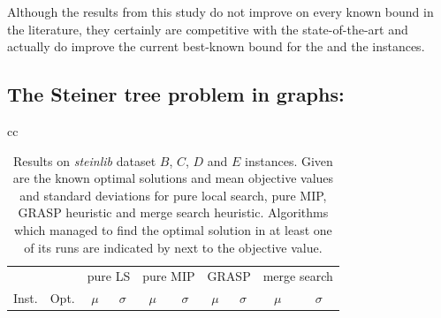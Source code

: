 \documentclass[journal]{IEEEtran}
\begin{document}
Although the results from this study do not improve on every known bound in the literature, they certainly are competitive with the state-of-the-art and actually do improve the current best-known bound for the \dmine{} and the \zucklarge{} instances.

\subsection{The Steiner tree problem in graphs:}

\begin{table}[h]
\centering
\caption[Results on \emph{steinlib} dataset \(B\) instances]{Results on \emph{steinlib} dataset \(B\), \(C\), \(D\) and \(E\) instances. Given are the known optimal solutions and mean objective values and standard deviations for pure local search, pure MIP, GRASP heuristic and merge search heuristic. Algorithms which managed to find the optimal solution in at least one of its runs are indicated by \opt{} next to the objective value.}\label{tab:stpg:results}
\begin{tabular}{cc}
\centering
\begin{adjustbox}{width=0.48\textwidth}
\begin{tabular}{lrrrrrrrrr} \toprule
 &  & \multicolumn{2}{c}{pure LS} & \multicolumn{2}{c}{pure MIP} & \multicolumn{2}{c}{GRASP} & \multicolumn{2}{c}{merge search}\\
\cmidrule(lr){3-4} \cmidrule(lr){5-6} \cmidrule(lr){7-8} \cmidrule(lr){9-10} 
Inst. & Opt. & \multicolumn{1}{c}{\(\mu\)}&\multicolumn{1}{c}{\(\sigma\)} & \multicolumn{1}{c}{\(\mu\)}&\multicolumn{1}{c}{\(\sigma\)}& \multicolumn{1}{c}{\(\mu\)}&\multicolumn{1}{c}{\(\sigma\)} & \multicolumn{1}{c}{\(\mu\)}&\multicolumn{1}{c}{\(\sigma\)}\\ \midrule
%

%
\bottomrule
\end{tabular}
\end{adjustbox}

\end{tabular}
\end{table}
\end{document}

